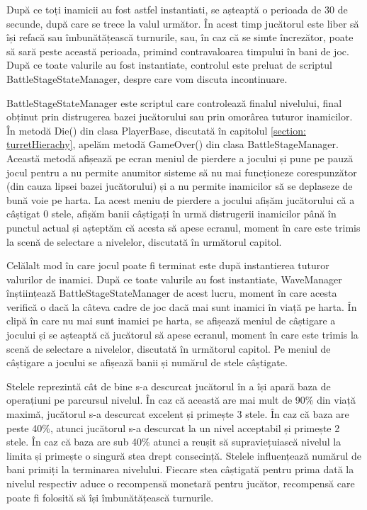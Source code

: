 \documentclass[12pt, a4paper]{article}
\begin{document}
	După ce toți inamicii au fost astfel instantiati, se așteaptă o perioada de 30 de secunde, după care se trece la valul următor. În acest timp jucătorul este liber să își refacă sau îmbunătățească turnurile, sau, în caz că se simte încrezător, poate să sară peste această perioada, primind contravaloarea timpului în bani de joc. După ce toate valurile au fost instantiate, controlul este preluat de scriptul BattleStageStateManager, despre care vom discuta incontinuare.
	\newline
	
	BattleStageStateManager este scriptul care controlează finalul nivelului, final obținut prin distrugerea bazei jucătorului sau prin omorârea tuturor inamicilor. În metodă Die() din clasa PlayerBase, discutată în capitolul \ref{section: turretHierachy}, apelăm metodă GameOver() din clasa BattleStageManager. Această metodă afișează pe ecran meniul de pierdere a jocului și pune pe pauză jocul pentru a nu permite anumitor sisteme să nu mai funcționeze corespunzător (din cauza lipsei bazei jucătorului) și a nu permite inamicilor să se deplaseze de bună voie pe harta. La acest meniu de pierdere a jocului afișăm jucătorului că a câștigat 0 stele, afișăm banii câștigați în urmă distrugerii inamicilor până în punctul actual și așteptăm că acesta să apese ecranul, moment în care este trimis la scenă de selectare a nivelelor, discutată în următorul capitol.
	\newline
	
	Celălalt mod în care jocul poate fi terminat este după instantierea tuturor valurilor de inamici. După ce toate valurile au fost instantiate, WaveManager înștiințează BattleStageStateManager de acest lucru, moment în care acesta verifică o dacă la câteva cadre de joc dacă mai sunt inamici în viață pe harta. În clipă în care nu mai sunt inamici pe harta, se afișează meniul de câștigare a jocului și se așteaptă că jucătorul să apese ecranul, moment în care este trimis la scenă de selectare a nivelelor, discutată în următorul capitol. Pe meniul de câștigare a jocului se afișează banii și numărul de stele câștigate. 
	\newline
	
	Stelele reprezintă cât de bine s-a descurcat jucătorul în a își apară baza de operațiuni pe parcursul nivelul. În caz că această are mai mult de 90\% din viață maximă, jucătorul s-a descurcat excelent și primește 3 stele. În caz că baza are peste 40\%, atunci jucătorul s-a descurcat la un nivel acceptabil și primește 2 stele. În caz că baza are sub 40\% atunci a reușit să supraviețuiască nivelul la limita și primește o singură stea drept consecință. Stelele influențează numărul de bani primiți la terminarea nivelului. Fiecare stea câștigată pentru prima dată la nivelul respectiv aduce o recompensă monetară pentru jucător, recompensă care poate fi folosită să își îmbunătățească turnurile. 
	\newline
	
\end{document}
